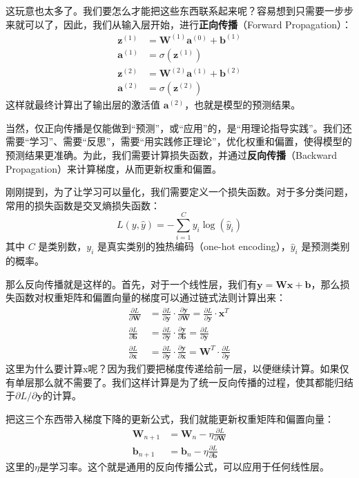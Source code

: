 这玩意也太多了。我们要怎么才能把这些东西联系起来呢？容易想到只需要一步步来就可以了，因此，我们从输入层开始，进行\textbf{正向传播}（Forward Propagation）：
\begin{align*}
\mathbf{z}^{(1)} &= \mathbf{W}^{(1)} \mathbf{a}^{(0)} + \mathbf{b}^{(1)} \\
\mathbf{a}^{(1)} &= \sigma(\mathbf{z}^{(1)}) \\
\mathbf{z}^{(2)} &= \mathbf{W}^{(2)} \mathbf{a}^{(1)} + \mathbf{b}^{(2)} \\
\mathbf{a}^{(2)} &= \sigma(\mathbf{z}^{(2)})
\end{align*}
这样就最终计算出了输出层的激活值 $\mathbf{a}^{(2)}$，也就是模型的预测结果。

当然，仅正向传播是仅能做到“预测”，或“应用”的，是“用理论指导实践”。我们还需要“学习”、需要“反思”，需要“用实践修正理论”，优化权重和偏置，使得模型的预测结果更准确。为此，我们需要计算损失函数，并通过\textbf{反向传播}（Backward Propagation）来计算梯度，从而更新权重和偏置。

刚刚提到，为了让学习可以量化，我们需要定义一个损失函数。对于多分类问题，常用的损失函数是交叉熵损失函数：
\[ L(y, \hat{y}) = -\sum_{i=1}^{C} y_i \log(\hat{y}_i) \]
其中 $C$ 是类别数，$y_i$ 是真实类别的独热编码（one-hot encoding），$\hat{y}_i$ 是预测类别的概率。

那么反向传播就是这样的。首先，对于一个线性层，我们有$\mathbf{y} = \mathbf{W}\mathbf{x} + \mathbf{b}$，那么损失函数对权重矩阵和偏置向量的梯度可以通过链式法则计算出来：
\begin{align*}
\frac{\partial L}{\partial \mathbf{W}} &= \frac{\partial L}{\partial \mathbf{y}} \cdot \frac{\partial \mathbf{y}}{\partial \mathbf{W}} = \frac{\partial L}{\partial \mathbf{y}} \cdot \mathbf{x}^T \\
\frac{\partial L}{\partial \mathbf{b}} &= \frac{\partial L}{\partial \mathbf{y}} \cdot \frac{\partial \mathbf{y}}{\partial \mathbf{b}} = \frac{\partial L}{\partial \mathbf{y}} \\
\frac{\partial L}{\partial \mathbf{x}} &= \frac{\partial L}{\partial \mathbf{y}} \cdot \frac{\partial \mathbf{y}}{\partial \mathbf{x}} = \mathbf{W}^T \cdot \frac{\partial L}{\partial \mathbf{y}}
\end{align*}
这里为什么要计算x呢？因为我们要把梯度传递给前一层，以便继续计算。如果仅有单层那么就不需要了。我们这样计算是为了统一反向传播的过程，使其都能归结于$\partial L / \partial \mathbf{y}$的计算。

把这三个东西带入梯度下降的更新公式，我们就能更新权重矩阵和偏置向量：
\begin{align*}
\mathbf{W}_{n+1} &= \mathbf{W}_{n} - \eta \frac{\partial L}{\partial \mathbf{W}} \\
\mathbf{b}_{n+1} &= \mathbf{b}_{n} - \eta \frac{\partial L}{\partial \mathbf{b}}
\end{align*}
这里的$\eta$是学习率。这个就是通用的反向传播公式，可以应用于任何线性层。


